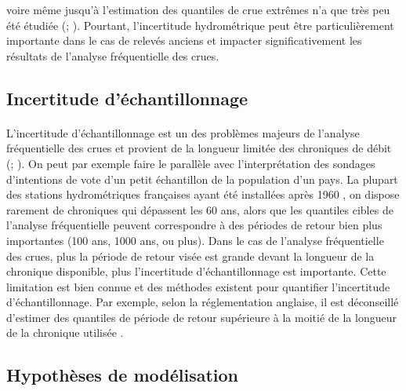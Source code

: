 voire même jusqu'à l'estimation des quantiles de crue extrêmes n'a que très peu été étudiée (\cite{horner_impact_2018}; \cite{steinbakk_propagation_2016}). Pourtant, l'incertitude hydrométrique peut être particulièrement importante dans le cas de relevés anciens et impacter significativement les résultats de l'analyse fréquentielle des crues.
	
	\subsection{Incertitude d'échantillonnage}
	
	\paragraph{} L'incertitude d'échantillonnage est un des problèmes majeurs de l'analyse fréquentielle des crues et provient de la longueur limitée des chroniques de débit (\cite{apel_flood_2004}; \cite{kjeldsen_uncertainty_2011}). On peut par exemple faire le parallèle avec l'interprétation des sondages d'intentions de vote d'un petit échantillon de la population d'un pays. La plupart des stations hydrométriques françaises ayant été installées après 1960 \citep{le_coz_quantifying_2017}, on dispose rarement de chroniques qui dépassent les 60 ans, alors que les quantiles cibles de l'analyse fréquentielle peuvent correspondre à des périodes de retour bien plus importantes (100 ans, 1000 ans, ou plus). Dans le cas de l'analyse fréquentielle des crues, plus la période de retour visée est grande devant la longueur de la chronique disponible, plus l'incertitude d'échantillonnage est importante. Cette limitation est bien connue et des méthodes existent pour quantifier l'incertitude d'échantillonnage. Par exemple, selon la réglementation anglaise, il est déconseillé d'estimer des quantiles de période de retour supérieure à la moitié de la longueur de la chronique utilisée \citep{whs_flood_2008}.
	
	\subsection{Hypothèses de modélisation}
		
